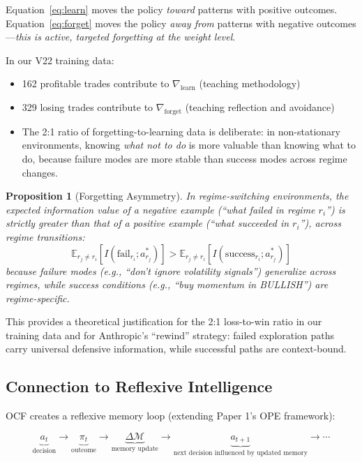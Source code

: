 \documentclass[11pt, a4paper]{article}
\newtheorem{proposition}{Proposition}
\begin{document}
Equation~\eqref{eq:learn} moves the policy \emph{toward} patterns with positive outcomes. Equation~\eqref{eq:forget} moves the policy \emph{away from} patterns with negative outcomes---\emph{this is active, targeted forgetting at the weight level}.

In our V22 training data:
\begin{itemize}
  \item 162 profitable trades contribute to $\nabla_{\text{learn}}$ (teaching methodology)
  \item 329 losing trades contribute to $\nabla_{\text{forget}}$ (teaching reflection and avoidance)
  \item The 2:1 ratio of forgetting-to-learning data is deliberate: in non-stationary environments, knowing \emph{what not to do} is more valuable than knowing what to do, because failure modes are more stable than success modes across regime changes.
\end{itemize}

\begin{proposition}[Forgetting Asymmetry]
In regime-switching environments, the expected information value of a negative example (``what failed in regime $r_i$'') is strictly greater than that of a positive example (``what succeeded in $r_i$''), across regime transitions:
\begin{equation}
  \mathbb{E}_{r_j \neq r_i}[I(\text{fail}_{r_i}; a^*_{r_j})] > \mathbb{E}_{r_j \neq r_i}[I(\text{success}_{r_i}; a^*_{r_j})]
\end{equation}
because failure modes (e.g., ``don't ignore volatility signals'') generalize across regimes, while success conditions (e.g., ``buy momentum in BULLISH'') are regime-specific.
\end{proposition}

This provides a theoretical justification for the 2:1 loss-to-win ratio in our training data and for Anthropic's ``rewind'' strategy: failed exploration paths carry universal defensive information, while successful paths are context-bound.

\subsection{Connection to Reflexive Intelligence}

OCF creates a reflexive memory loop (extending Paper 1's OPE framework):

\begin{equation}
  \underbrace{a_t}_{\text{decision}} \to \underbrace{\pi_t}_{\text{outcome}} \to \underbrace{\Delta\mathcal{M}}_{\text{memory update}} \to \underbrace{a_{t+1}}_{\text{next decision influenced by updated memory}} \to \cdots
\end{equation}
\end{document}
